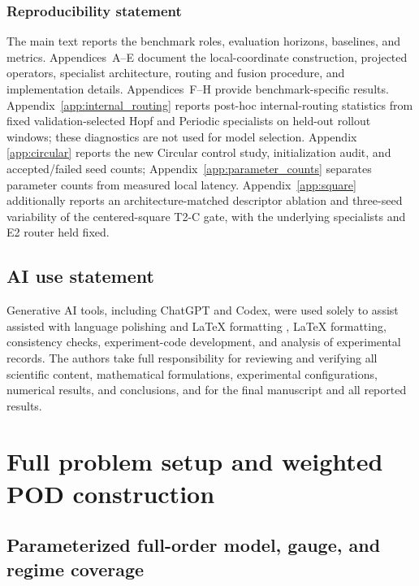 \documentclass{article}
\providecommand{\DIFaddtex}[1]{{\protect\color{blue} \sf #1}} %
\providecommand{\DIFdeltex}[1]{{\protect\color{red} \scriptsize #1}} %
\providecommand{\DIFaddbegin}{} %
\providecommand{\DIFaddend}{} %
\providecommand{\DIFdelbegin}{} %
\providecommand{\DIFdelend}{} %
\providecommand{\DIFadd}[1]{\texorpdfstring{\DIFaddtex{#1}}{#1}} %
\providecommand{\DIFdel}[1]{\texorpdfstring{\DIFdeltex{#1}}{}} %
\begin{document}
\subsubsection*{Reproducibility statement}
The main text reports the benchmark roles, evaluation horizons, baselines, and metrics. Appendices~A--E document the local-coordinate construction, projected operators, specialist architecture, routing and fusion procedure, and implementation details. Appendices~F--H provide benchmark-specific results.
Appendix~\ref{app:internal_routing} reports post-hoc internal-routing statistics
from fixed validation-selected Hopf and Periodic specialists on held-out
rollout windows; these diagnostics are not used for model selection.
Appendix~\DIFaddbegin \DIFadd{\ref{app:circular} reports the new Circular control study, initialization audit, and accepted/failed seed counts; Appendix~\ref{app:parameter_counts} separates parameter counts from measured local latency.
Appendix~}\DIFaddend \ref{app:square} additionally reports an architecture-matched descriptor
ablation and three-seed variability of the centered-square T2-C gate, with the
underlying specialists and E2 router held fixed.

\subsection*{AI use statement}
Generative AI tools, including ChatGPT and Codex, \DIFdelbegin \DIFdel{were used solely to assist }\DIFdelend \DIFaddbegin \DIFadd{assisted }\DIFaddend with language polishing\DIFdelbegin \DIFdel{and LaTeX formatting}\DIFdelend \DIFaddbegin \DIFadd{, LaTeX formatting, consistency checks, experiment-code development, and analysis of experimental records}\DIFaddend . The authors take full responsibility for reviewing and verifying all scientific
content, mathematical formulations, experimental configurations, numerical
results, and conclusions, and for the final manuscript and all reported results.




\appendix
\section{Full problem setup and weighted POD construction}
\label{app:problem_pod}

\subsection{Parameterized full-order model, gauge, and regime coverage}
\end{document}

